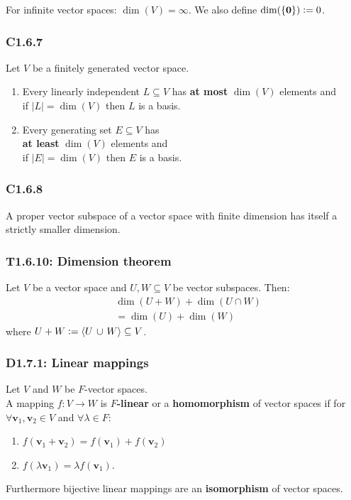 \documentclass{article}
\newcommand{\deq}{\vcentcolon=}
\newcommand{\vc}[1]{\boldsymbol{#1}}
\begin{document}
\begin{multicols*}{3}
For infinite vector spaces: $\dim(V)=\infty$.
We also define $\dim(\{\vc{0}\})\deq0$.

\subsubsection*{C1.6.7}
Let $V$ be a finitely generated vector space.
\begin{enumerate}
    \item Every linearly independent $L\subseteq V$
    has \textbf{at most} $\dim(V)$ elements and \\
    if $|L|=\dim(V)$ then $L$ is a basis.

    \item Every generating set $E\subseteq V$ has \\
    \textbf{at least} $\dim(V)$ elements and \\
    if $|E|=\dim(V)$ then $E$ is a basis.
\end{enumerate}

\subsubsection*{C1.6.8}
A proper vector subspace of a vector space 
with finite dimension has itself a strictly smaller dimension.

\subsubsection*{T1.6.10: Dimension theorem}
Let $V$ be a vector space and 
$U,W\subseteq V$ be vector subspaces. Then:
\begin{align*}
    &\dim(U+W)+\dim(U\cap W) \\
    &=\dim(U)+\dim(W)
\end{align*}
where $U+W\deq\langle U\hspace{0.02in}
\cup\hspace{0.02in}W\rangle\subseteq V$.

\subsubsection*{D1.7.1: Linear mappings}
Let $V$ and $W$ be $F$-vector spaces. \\
A mapping $f:V\rightarrow W$ is \textbf{$F$-linear} or a
\textbf{homomorphism} of vector spaces if for
$\forall\vc{v}_1,\vc{v}_2\in V$ and $\forall\lambda\in F$:
\begin{enumerate}
    \item $f(\vc{v}_1+\vc{v}_2)=f(\vc{v}_1)+f(\vc{v}_2)$
    \item $f(\lambda\vc{v}_1)=\lambda f(\vc{v}_1)$.
\end{enumerate}
Furthermore bijective linear mappings are an \textbf{isomorphism}
of vector spaces.


\end{multicols*}
\end{document}
